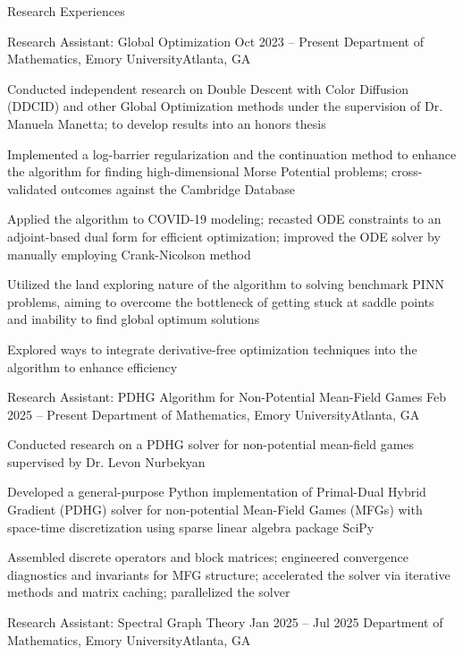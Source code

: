 \documentclass[10pt, letterpaper]{resume} %
\begin{document}
\begin{rSection}{Research Experiences}
\begin{rSubsection}
	{Research Assistant: Global Optimization}
	{Oct 2023 -- Present}
	{Department of Mathematics, Emory University}{Atlanta, GA}
	
	\item Conducted independent research on Double Descent with Color Diffusion (DDCID) and other Global Optimization methods under the supervision of Dr. Manuela Manetta; to develop results into an honors thesis
	\item Implemented a log-barrier regularization and the continuation method to enhance the algorithm for finding high-dimensional Morse Potential problems; cross-validated outcomes against the Cambridge Database
	\item Applied the algorithm to COVID-19 modeling; recasted ODE constraints to an adjoint-based dual form for efficient optimization; improved the ODE solver by manually employing Crank-Nicolson method
	\item Utilized the land exploring nature of the algorithm to solving benchmark PINN problems, aiming to overcome the bottleneck of getting stuck at saddle points and inability to find global optimum solutions
	\item Explored ways to integrate derivative-free optimization techniques into the algorithm to enhance efficiency
\end{rSubsection}

\begin{rSubsection}
	{Research Assistant: PDHG Algorithm for Non-Potential Mean-Field Games}
	{Feb 2025 -- Present}
	{Department of Mathematics, Emory University}{Atlanta, GA}
	
	\item Conducted research on a PDHG solver for non-potential mean-field games supervised by Dr. Levon Nurbekyan
	\item Developed a general-purpose Python implementation of Primal-Dual Hybrid Gradient (PDHG) solver for non-potential Mean-Field Games (MFGs) with space-time discretization using sparse linear algebra package SciPy
	\item Assembled discrete operators and block matrices; engineered convergence diagnostics and invariants for MFG structure; accelerated the solver via iterative methods and matrix caching; parallelized the solver
\end{rSubsection}

\begin{rSubsection}
	{Research Assistant: Spectral Graph Theory}
	{Jan 2025 -- Jul 2025}
	{Department of Mathematics, Emory University}{Atlanta, GA}
	

\end{rSubsection}
\end{rSection}
\end{document}
